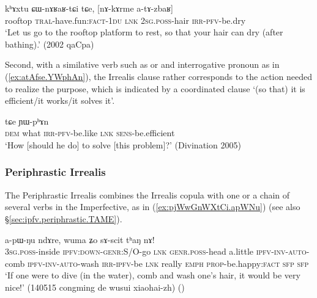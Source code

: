 \begin{exe}
\ex \label{ex:nAkArme.atAzbaR}
\gll kʰɤxtu ɕɯ-nɤʁaʁ-tɕi tɕe, [nɤ-kɤrme a-tɤ-zbaʁ] \\
rooftop \textsc{tral}-have.fun:\textsc{fact}-\textsc{1du} \textsc{lnk} \textsc{2sg}.\textsc{poss}-hair \textsc{irr}-\textsc{pfv}-be.dry \\
\glt `Let us go to the rooftop platform to rest, so that your hair can dry (after bathing).' (2002 qaCpa)
\end{exe}

Second, with a similative verb such as  or  and interrogative pronoun as in (\ref{ex:atAfse.YWphAn}), the Irrealis clause rather corresponds to the action needed to realize the purpose, which is indicated by a coordinated clause  `(so that) it is efficient/it works/it solves it'. 

\begin{exe}
\ex \label{ex:atAfse.YWphAn}
 tɕe ɲɯ-pʰɤn \\
\textsc{dem} what \textsc{irr}-\textsc{pfv}-be.like \textsc{lnk} \textsc{sens}-be.efficient \\
\glt `How [should he do] to solve [this problem]?' (Divination 2005)
\end{exe}
 
\subsubsection{Periphrastic Irrealis} \label{sec:irrealis.periphrastic}

The Periphrastic Irrealis combines the Irrealis copula  with one or a chain of several verbs in the Imperfective, as in (\ref{ex:pjWwGnWXtCi.apWNu}) (see also §\ref{sec:ipfv.periphrastic.TAME}). 

\begin{exe}
\ex \label{ex:pjWwGnWXtCi.apWNu}
 a-pɯ-ŋu ndɤre, wuma ʑo sɤ-scit tʰaŋ nɤ! \\
\textsc{3sg}.\textsc{poss}-inside \textsc{ipfv}:\textsc{down}-\textsc{genr}:S/O-go \textsc{lnk} \textsc{genr}.\textsc{poss}-head a.little \textsc{ipfv}-\textsc{inv}-\textsc{auto}-comb \textsc{ipfv}-\textsc{inv}-\textsc{auto}-wash \textsc{irr}-\textsc{ipfv}-be \textsc{lnk} really \textsc{emph} \textsc{prop}-be.happy:\textsc{fact} \textsc{sfp} \textsc{sfp} \\
\glt `If one were to dive (in the water), comb and wash one's hair, it would be very nice!' (140515 congming de wusui xiaohai-zh)
()
\end{exe}

